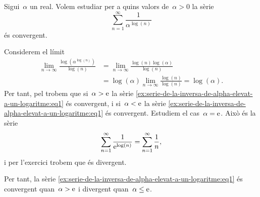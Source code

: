 \documentclass[../analisi-matematica.tex]{subfiles}
\begin{document}
    \begin{example}
        \label{ex:serie-de-la-inversa-de-alpha-elevat-a-un-logaritme}
        Sigui~\(\alpha\) un real.
        Volem estudiar per a quins valors de~\(\alpha>0\) la sèrie
        \begin{equation}
            \label{ex:serie-de-la-inversa-de-alpha-elevat-a-un-logaritme:eq1}
            \sum_{n=1}^{\infty}\frac{1}{\alpha^{\log(n)}}
        \end{equation}
        és convergent.
    \end{example}
    \begin{solution}
        Considerem el límit
        \begin{align*}
            \lim_{n\to\infty}\frac{\log\left(\alpha^{\log(n)}\right)}{\log(n)}&=\lim_{n\to\infty}\frac{\log(n)\log(\alpha)}{\log(n)} \\
            &=\log(\alpha)\lim_{n\to\infty}\frac{\log(n)}{\log(n)}=\log(\alpha).
        \end{align*}
        Per tant, pel  trobem que si~\(\alpha>\mathrm{e}\) la sèrie \eqref{ex:serie-de-la-inversa-de-alpha-elevat-a-un-logaritme:eq1} és convergent, i si~\(\alpha<\mathrm{e}\) la sèrie \eqref{ex:serie-de-la-inversa-de-alpha-elevat-a-un-logaritme:eq1} és convergent.
        Estudiem el cas~\(\alpha=\mathrm{e}\).
        Això és la sèrie
        \[
            \sum_{n=1}^{\infty}\frac{1}{\mathrm{e}^{\log(n)}}=\sum_{n=1}^{\infty}\frac{1}{n},
        \]
        i per l'exercici  trobem que és divergent.

        Per tant, la sèrie \eqref{ex:serie-de-la-inversa-de-alpha-elevat-a-un-logaritme:eq1} és convergent quan~\(\alpha>\mathrm{e}\) i divergent quan~\(\alpha\leq\mathrm{e}\).
    \end{solution}
\end{document}
